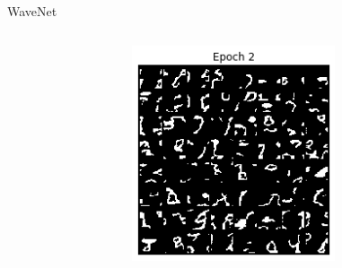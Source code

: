 \begin{frame}[allowframebreaks]{WaveNet}
\begin{columns}
\begin{column}{0.18\linewidth}
\begin{figure}
            \end{figure}
        \end{column}
        \begin{column}{0.18\linewidth}
            \begin{figure}
                \centering
                \includegraphics[width=1\linewidth]{images/autoregressive/mnist/epoch-2.png}
            \end{figure}
        \end{column}
        \begin{column}{0.18\linewidth}
            \begin{figure}
                \centering

\end{figure}
\end{column}
\end{columns}
\end{frame}
